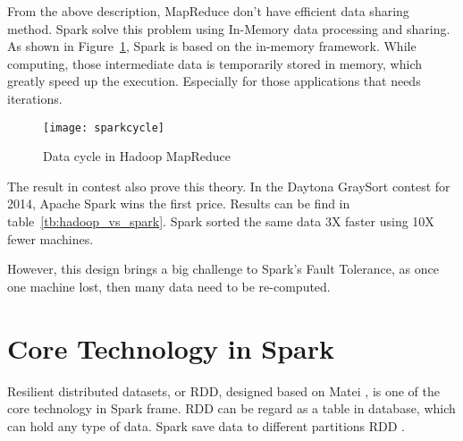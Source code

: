 \clearpage
From the above description, MapReduce don’t have efficient data sharing method. Spark solve this problem using In-Memory data processing and sharing\cite{apache_spark}. As shown in Figure~\ref{fg:spark}, Spark is based on the in-memory framework. While computing, those intermediate data is temporarily stored in memory, which greatly speed up the execution. Especially for those applications that needs iterations.

\begin{figure}[h]
	\centering
	\texttt{[image: sparkcycle]}
	\caption{Data cycle in Hadoop MapReduce}
	\label{fg:spark}
\end{figure}


The result in contest also prove this theory. In the Daytona GraySort contest for 2014, Apache Spark wins the first price\cite{3_xin_2014}. Results can be find in table~\ref{tb:hadoop_vs_spark}. Spark sorted the same data 3X faster using 10X fewer machines.
\begin{table}[h]
	\centering
	\caption{Spark TeraSort vs MapReduce\cite{3_xin_2014}}
	\label{tb:hadoop_vs_spark}
\end{table}

However, this design brings a big challenge to Spark’s Fault Tolerance, as once one machine lost, then many data need to be re-computed.

\clearpage
\section{Core Technology in Spark}
Resilient distributed datasets, or RDD, designed based on Matei \cite{zaharia2012resilient}, is one of the core technology in Spark frame. RDD can be regard as a table in database, which can hold any type of data. Spark save data to different partitions RDD \cite{ryza2015advanced}.\\


